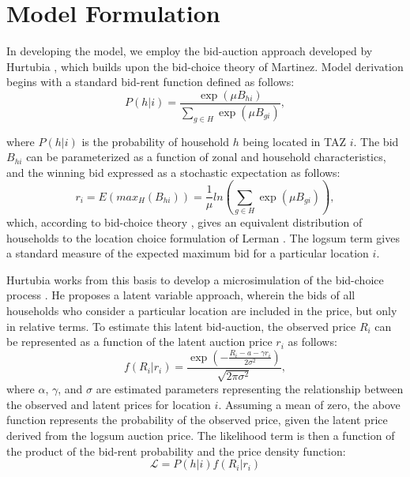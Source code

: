 \section{Model Formulation}
In developing the model, we employ the bid-auction approach developed by Hurtubia \cite{Hurtubia2012}, which builds upon the bid-choice theory of Martinez. Model derivation begins with a standard bid-rent function \cite{Ellickson1981} defined as follows:
\begin{equation}
	P(h|i) =  \frac{\exp\left(\mu B_{hi} \right)}{\sum\limits_{g \in H} \exp\left(\mu B_{gi} \right)} ,
\end{equation}

where $P(h|i)$ is the probability of household $h$ being located in TAZ $i$. The bid $B_{hi}$ can be parameterized as a function of zonal and household characteristics, and the winning bid expressed as a stochastic expectation as follows:
\begin{equation}
	r_i =  E\left(max_H\left(B_{hi}\right)\right) = \frac{1}{\mu} ln\left(\sum_{g \in H} \exp\left(\mu B_{gi}\right)\right) ,
\end{equation}
which, according to bid-choice theory \cite{Martinez1992a}, gives an equivalent distribution of households to the location choice formulation of Lerman \cite{Lerman1976}. The logsum term gives a standard measure of the expected maximum bid for a particular location $i$.

Hurtubia works from this basis to develop a microsimulation of the bid-choice process \cite{Hurtubia2012}. He proposes a latent variable approach, wherein the bids of all households who consider a particular location are included in the price, but only in relative terms. To estimate this latent bid-auction, the observed price $R_i$ can be represented as a function of the latent auction price $r_i$ as follows:
% 
% 
\begin{equation}
f(R_i|r_i) =  \frac{\exp\left(- \frac{R_i-a-\gamma r_i}{2\sigma^2}\right)}{\sqrt{2\pi\sigma^2}} ,
\end{equation}
where $\alpha$, $\gamma$, and $\sigma$ are estimated parameters representing the relationship between the observed and latent prices for location $i$. Assuming a mean of zero, the above function represents the probability of the observed price, given the latent price derived from the logsum auction price. The likelihood term is then a function of the product of the bid-rent probability and the price density function:
\begin{equation}
\mathcal{L} = P(h|i)f(R_i|r_i)
\end{equation}

